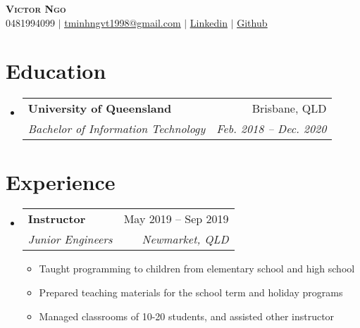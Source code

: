 \documentclass[letterpaper,11pt]{article}
\makeatletter
\newcommand{\resumeItem}[1]{
  \item\small{
    {#1 \vspace{-2pt}}
  }
}
\newcommand{\resumeSubheading}[4]{
  \vspace{-2pt}\item
    \begin{tabular*}{0.97\textwidth}[t]{l@{\extracolsep{\fill}}r}
      \textbf{#1} & #2 \\
      \textit{\small#3} & \textit{\small #4} \\
    \end{tabular*}\vspace{-7pt}
}
\newcommand{\resumeSubSubheading}[2]{
    \item
    \begin{tabular*}{0.97\textwidth}{l@{\extracolsep{\fill}}r}
      \textit{\small#1} & \textit{\small #2} \\
    \end{tabular*}\vspace{-7pt}
}
\newcommand{\resumeSubHeadingListStart}{\begin{itemize}[leftmargin=0.15in, label={}]}
\newcommand{\resumeSubHeadingListEnd}{\end{itemize}}
\newcommand{\resumeItemListStart}{\begin{itemize}}
\newcommand{\resumeItemListEnd}{\end{itemize}\vspace{-5pt}}
\makeatother
\begin{document}
\begin{center}
    \textbf{\Huge \scshape Victor Ngo} \\ \vspace{1pt}
    \small 0481994099 $|$ \href{mailto:tminhngvt1998@gmail.com}{\underline{tminhngvt1998@gmail.com}} $|$ 
    \href{https://linkedin.com/in/victor-ngo-768366147/}{\underline{Linkedin}} $|$
    \href{https://github.com/BrainIs404}{\underline{Github}}
\end{center}


\section{Education}
  \resumeSubHeadingListStart
    \resumeSubheading
      {University of Queensland}{Brisbane, QLD}
      {Bachelor of Information Technology}{Feb. 2018 -- Dec. 2020}
  \resumeSubHeadingListEnd


\section{Experience}
  \resumeSubHeadingListStart

    \resumeSubheading
      {Instructor}{May 2019 -- Sep 2019}
      {Junior Engineers}{Newmarket, QLD}
      \resumeItemListStart
        \resumeItem{Taught programming to children from elementary school and high school}
        \resumeItem{Prepared teaching materials for the school term and holiday programs}
        \resumeItem{Managed classrooms of 10-20 students, and assisted other instructor}
      \resumeItemListEnd



  \resumeSubHeadingListEnd


\end{document}
